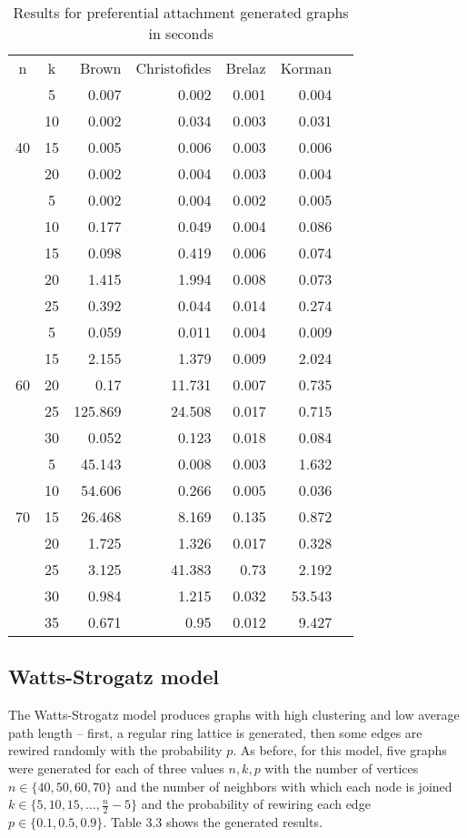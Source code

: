 \begin{table}
\caption{Results for preferential attachment generated graphs in seconds}
\label{tab:tab2}
\setlength{\tabcolsep}{1.15em} %
\renewcommand{\arraystretch}{1.2}%
\centering
\begin{tabular}{|c|c|rrrr|l}
\cline{1-6}
n & k & \multicolumn{1}{r|}{Brown} & \multicolumn{1}{r|}{Christofides} & \multicolumn{1}{r|}{Brelaz} & Korman &  \\ \cline{1-6}
\multirow{5}{*}{40} 
 & 5 & 0.007 & 0.002 & 0.001 & 0.004 &  \\
 & 10 & 0.002 & 0.034 & 0.003 & 0.031 &  \\
 & 15 & 0.005 & 0.006 & 0.003 & 0.006 &  \\
 & 20 & 0.002 & 0.004 & 0.003 & 0.004 &  \\
\cline{1-6}
\multirow{5}{*}{50} 
 & 5 & 0.002 & 0.004 & 0.002 & 0.005 &  \\
 & 10 & 0.177 & 0.049 & 0.004 & 0.086 &  \\
 & 15 & 0.098 & 0.419 & 0.006 & 0.074 &  \\
 & 20 & 1.415 & 1.994 & 0.008 & 0.073 &  \\
 & 25 & 0.392 & 0.044 & 0.014 & 0.274 &  \\ 
\cline{1-6}
\multirow{5}{*}{60} 
 & 5 & 0.059 & 0.011 & 0.004 & 0.009 &  \\
 & 15 & 2.155 & 1.379 & 0.009 & 2.024 &  \\
 & 20 & 0.17 & 11.731 & 0.007 & 0.735 &  \\
 & 25 & 125.869 & 24.508 & 0.017 & 0.715 &  \\
 & 30 & 0.052 & 0.123 & 0.018 & 0.084 &  \\ 
\cline{1-6}
\multirow{5}{*}{70} 
 & 5 & 45.143 & 0.008 & 0.003 & 1.632 &  \\
 & 10 & 54.606 & 0.266 & 0.005 & 0.036 &  \\
 & 15 & 26.468 & 8.169 & 0.135 & 0.872 &  \\
 & 20 & 1.725 & 1.326 & 0.017 & 0.328 &  \\
 & 25 & 3.125 & 41.383 & 0.73 & 2.192 &  \\ 
 & 30 & 0.984 & 1.215 & 0.032 & 53.543 & \\
 & 35 & 0.671 & 0.95 & 0.012 & 9.427 & \\
 \cline{1-6}
\end{tabular}
\end{table}

\subsection{Watts-Strogatz model}
The Watts-Strogatz model produces graphs with high clustering and low average path length -- first, a regular ring lattice is generated, then some edges are rewired randomly with the probability $p$.
As before, for this model, five graphs were generated for each of three values $n, k, p$ with the number of vertices $n \in \{40, 50, 60, 70\}$ and the number of neighbors with which each node is joined $k \in \{5, 10, 15, \dots, \frac{n}{2} - 5\}$ and the probability of rewiring each edge $p \in \{0.1, 0.5, 0.9\}$. Table 3.3 shows the generated results. 

